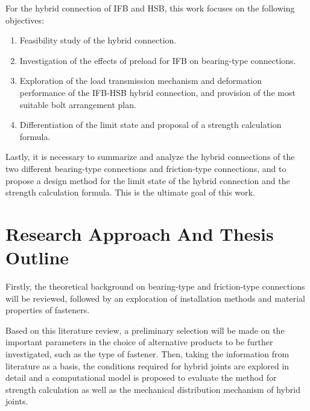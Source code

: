 

For the hybrid connection of IFB and HSB, this work focuses on the following objectives: 

\begin{enumerate}
    \item Feasibility study of the hybrid connection. 
    \item Investigation of the effects of preload for IFB on bearing-type connections.
    \item Exploration of the load transmission mechanism and deformation performance of the IFB-HSB hybrid connection, and provision of the most suitable bolt arrangement plan.
    \item Differentiation of the limit state and proposal of a strength calculation formula.
\end{enumerate}

Lastly, it is necessary to summarize and analyze the hybrid connections of the two different bearing-type connections and friction-type connections, and to propose a design method for the limit state of the hybrid connection and the strength calculation formula. This is the ultimate goal of this work.





\section{Research Approach And Thesis Outline}

Firstly, the theoretical background on bearing-type and friction-type connections will be reviewed, followed by an exploration of installation methods and material properties of fasteners.

Based on this literature review, a preliminary selection will be made on the important parameters in the choice of alternative products to be further investigated, such as the type of fastener. Then, taking the information from literature as a basis, the conditions required for hybrid joints are explored in detail and a computational model is proposed to evaluate the method for strength calculation as well as the mechanical distribution mechanism of hybrid joints.

